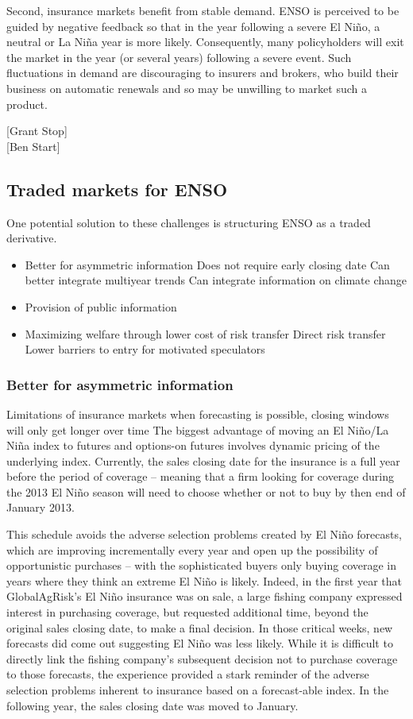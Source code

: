\documentclass[authoryear]{article}
\begin{document}
Second, insurance markets benefit from stable demand. ENSO is perceived to be guided by negative feedback so that in the year following a severe El Ni\~no, a neutral or La Ni\~na year is more likely. Consequently, many policyholders will exit the market in the year (or several years) following a severe event. Such fluctuations in demand are discouraging to insurers and brokers, who build their business on automatic renewals and so may be unwilling to market such a product.

[Grant Stop]\\

[Ben Start]


\subsection{Traded markets for ENSO}
One potential solution to these challenges is structuring ENSO as a traded derivative.


\begin{itemize}
\item Better for asymmetric information
  \subitem Does not require early closing date
  \subitem Can better integrate multiyear trends
  \subitem Can integrate information on climate change
\item Provision of public information
\item Maximizing welfare through lower cost of risk transfer
  \subitem Direct risk transfer
  \subitem Lower barriers to entry for motivated speculators
\end{itemize}

\subsubsection{Better for asymmetric information} Limitations of insurance markets when forecasting is possible, closing windows will only get longer over time
The biggest advantage of moving an El Ni\~no/La Ni\~na index to futures and options-on futures involves dynamic pricing of the underlying index. Currently, the sales closing date for the insurance is a full year before the period of coverage – meaning that a firm looking for coverage during the 2013 El Ni\~no season will need to choose whether or not to buy by then end of January 2013. 

This schedule avoids the adverse selection problems created by El Ni\~no forecasts, which are improving incrementally every year and open up the possibility of opportunistic purchases – with the sophisticated buyers only buying coverage in years where they think an extreme El Ni\~no is likely. Indeed, in the first year that GlobalAgRisk’s El Ni\~no insurance was on sale, a large fishing company expressed interest in purchasing coverage, but requested additional time, beyond the original sales closing date, to make a final decision. In those critical weeks, new forecasts did come out suggesting El Ni\~no was less likely. While it is difficult to directly link the fishing company's subsequent decision not to purchase coverage to those forecasts, the experience provided a stark reminder of the adverse selection problems inherent to insurance based on a forecast-able index. In the following year, the sales closing date was moved to January. 
\end{document}

